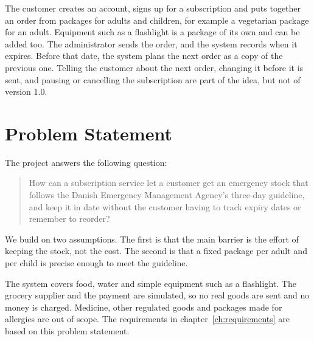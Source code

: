 The customer creates an account, signs up for a subscription and puts together an
order from packages for adults and children, for example a vegetarian package for an
adult. Equipment such as a flashlight is a package of its own and can be added too.
The administrator sends the order, and the system records when it expires. Before
that date, the system plans the next order as a copy of the previous one. Telling the
customer about the next order, changing it before it is sent, and pausing or
cancelling the subscription are part of the idea, but not of version 1.0.

\section{Problem Statement}\label{sec:problem-statement}

The project answers the following question:

\begin{quote}
How can a subscription service let a customer get an emergency stock that follows the
Danish Emergency Management Agency's three-day guideline, and keep it in date without
the customer having to track expiry dates or remember to reorder?
\end{quote}

We build on two assumptions. The first is that the main barrier is the effort of
keeping the stock, not the cost. The second is that a fixed package per adult and per
child is precise enough to meet the guideline.

The system covers food, water and simple equipment such as a flashlight. The grocery
supplier and the payment are simulated, so no real goods are sent and no money is
charged. Medicine, other regulated goods and packages made for allergies are out of
scope. The requirements in chapter~\ref{ch:requirements} are based on this problem
statement.
